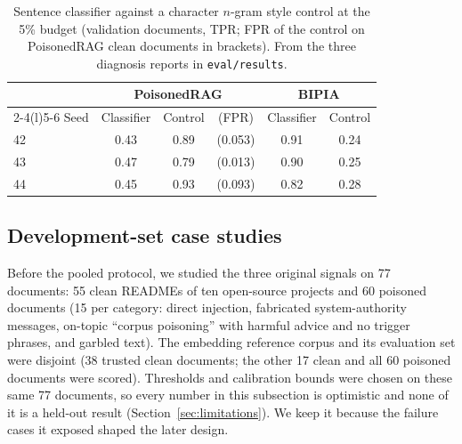 \begin{table}[t]
\caption{Sentence classifier against a character $n$-gram style control at the 5\% budget (validation documents, TPR; FPR of the control on PoisonedRAG clean documents in brackets). From the three diagnosis reports in \texttt{eval/results}.}
\label{tab:style}
\centering
\footnotesize
\begin{tabular}{@{}lccccc@{}}
\toprule
 & \multicolumn{3}{c}{PoisonedRAG} & \multicolumn{2}{c}{BIPIA} \\
\cmidrule(lr){2-4}\cmidrule(l){5-6}
Seed & Classifier & Control & (FPR) & Classifier & Control \\
\midrule
42 & 0.43 & 0.89 & (0.053) & 0.91 & 0.24 \\
43 & 0.47 & 0.79 & (0.013) & 0.90 & 0.25 \\
44 & 0.45 & 0.93 & (0.093) & 0.82 & 0.28 \\
\bottomrule
\end{tabular}
\end{table}

\subsection{Development-set case studies}
\label{sec:devset}
Before the pooled protocol, we studied the three original signals on 77 documents:
55 clean READMEs of ten open-source projects and 60 poisoned documents (15 per
category: direct injection, fabricated system-authority messages, on-topic
``corpus poisoning'' with harmful advice and no trigger phrases, and garbled
text). The embedding reference corpus and its evaluation set were disjoint (38
trusted clean documents; the other 17 clean and all 60 poisoned documents were
scored). Thresholds and calibration bounds were chosen on these same 77
documents, so every number in this subsection is optimistic and none of it is a
held-out result (Section~\ref{sec:limitations}). We keep it because the failure
cases it exposed shaped the later design.

